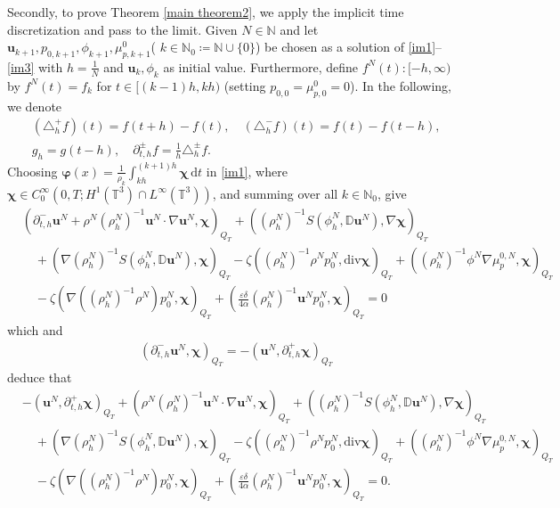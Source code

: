 \documentclass[reqno,a4paper,11pt]{amsart}
\theoremstyle{plain}
\numberwithin{equation}{section}
\begin{document}
Secondly, to prove Theorem \ref{main theorem2}, we apply the implicit time discretization and pass to the limit. Given $N\in \mathbb{N}$ and let $\mathbf{u}_{k+1}, p_{0,k+1},\phi_{k+1},\mu_{p,k+1}^{0}$( $k\in \mathbb{N}_{0}\coloneqq \mathbb{N}\cup \{0\}$) be chosen as a solution of \eqref{im1}--\eqref{im3} with $h=\frac{1}{N}$ and $\mathbf{u}_{k},\phi_{k}$ as initial value. Furthermore, define $f^{N}(t):[-h,\infty)$ by $f^{N}(t)=f_{k}$ for $t\in [(k-1)h,kh)$ (setting $p_{0,0}=\mu_{p,0}^{0}=0$). In the following, we denote
\begin{align*}
	&(\triangle_{h}^{+}f)(t)=f(t+h)-f(t),\quad (\triangle_{h}^{-}f)(t)=f(t)-f(t-h),
	\\&g_{h}=g(t-h),\quad\partial_{t,h}^{\pm}f=\frac{1}{h}\triangle_{h}^{\pm}f.
\end{align*}
Choosing $\boldsymbol{\varphi}(x)=\frac{1}{\rho_{k}}\int_{kh}^{(k+1)h} \boldsymbol{\chi}\,\mathrm dt$ in \eqref{im1}, where $\boldsymbol{\chi}\in C_{0}^{\infty}(0,T;H^{1}(\mathbb{T}^{3})\cap L^{\infty}(\mathbb{T}^{3}))$, and summing over all $k\in \mathbb{N}_{0}$, give
\begin{align}\label{weak11}
	&\nonumber(\partial_{t,h}^{-}\mathbf{u}^{N}+\rho^{N}(\rho_{h}^{N})^{-1}\mathbf{u}^{N}\cdot\nabla \mathbf{u}^{N},\boldsymbol{\chi})_{Q_{T}}+((\rho_{h}^{N})^{-1}S(\phi_{h}^{N},\mathbb{ D}\mathbf{u}^{N}),\nabla\boldsymbol{\chi})_{Q_{T}}
	\\&\nonumber\quad+(\nabla(\rho_{h}^{N})^{-1}S(\phi_{h}^{N},\mathbb{ D}\mathbf{u}^{N}),\boldsymbol{\chi})_{Q_{T}}
	-\zeta((\rho_{h}^{N})^{-1}\rho^{N}p_{0}^{N},\mathrm{div}\boldsymbol{\chi})_{Q_{T}}+((\rho_{h}^{N})^{-1}\phi^{N}\nabla\mu_{p}^{0,N},\boldsymbol{\chi})_{Q_{T}}
	\\&\quad-\zeta(\nabla((\rho_{h}^{N})^{-1}\rho^{N}) p_{0}^{N},\boldsymbol{\chi})_{Q_{T}}
	+(\frac{\varepsilon\delta}{4\alpha}(\rho_{h}^{N})^{-1}\mathbf{u}^{N}p_{0}^{N},\boldsymbol{\chi})_{Q_{T}}=0
\end{align}
which and
\begin{align*}
	&(\partial_{t,h}^{-}\mathbf{u}^{N},\boldsymbol{\chi})_{Q_{T}}=-(\mathbf{u}^{N},\partial_{t,h}^{+}\boldsymbol{\chi})_{Q_{T}}
\end{align*}
deduce  that
\begin{align}\label{weak111}
	&\nonumber-(\mathbf{u}^{N},\partial_{t,h}^{+}\boldsymbol{\chi})_{Q_{T}}+(\rho^{N}(\rho_{h}^{N})^{-1}\mathbf{u}^{N}\cdot\nabla \mathbf{u}^{N},\boldsymbol{\chi})_{Q_{T}}+((\rho_{h}^{N})^{-1}S(\phi_{h}^{N},\mathbb{ D}\mathbf{u}^{N}),\nabla\boldsymbol{\chi})_{Q_{T}}
	\\&\nonumber\quad+(\nabla(\rho_{h}^{N})^{-1}S(\phi_{h}^{N},\mathbb{ D}\mathbf{u}^{N}),\boldsymbol{\chi})_{Q_{T}}
	-\zeta((\rho_{h}^{N})^{-1}\rho^{N}p_{0}^{N},\mathrm{div}\boldsymbol{\chi})_{Q_{T}}+((\rho_{h}^{N})^{-1}\phi^{N}\nabla\mu_{p}^{0,N},\boldsymbol{\chi})_{Q_{T}}
	\\&\quad-\zeta(\nabla((\rho_{h}^{N})^{-1}\rho^{N}) p_{0}^{N},\boldsymbol{\chi})_{Q_{T}}
	+(\frac{\varepsilon\delta}{4\alpha}(\rho_{h}^{N})^{-1}\mathbf{u}^{N}p_{0}^{N},\boldsymbol{\chi})_{Q_{T}}=0.
\end{align}
\end{document}
